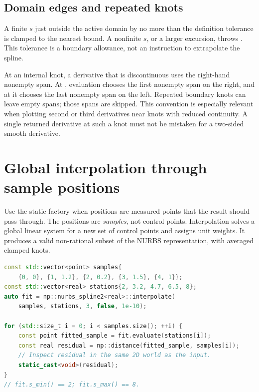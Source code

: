 \subsection{Domain edges and repeated knots}

A finite $s$ just outside the active domain by no more than the definition
tolerance is clamped to the nearest bound. A nonfinite $s$, or a larger
excursion, throws . This tolerance is a boundary
allowance, not an instruction to extrapolate the spline.

At an internal knot, a derivative that is discontinuous uses the right-hand
nonempty span. At , evaluation chooses the first nonempty span
on the right, and at  it chooses the last nonempty span on the
left. Repeated boundary knots can leave empty spans; those spans are skipped.
This convention is especially relevant when plotting second or third
derivatives near knots with reduced continuity. A single returned derivative
at such a knot must not be mistaken for a two-sided smooth derivative.

\section{Global interpolation through sample positions}
\label{sec:spline-interpolation}

Use the static  factory when positions
are measured points that the result should pass through. The positions are
\emph{samples}, not control points. Interpolation solves a global linear
system for a new set of control points and assigns unit weights. It produces
a valid non-rational subset of the NURBS representation, with averaged
clamped knots.

\begin{lstlisting}[language=C++,caption={Interpolation preserves the supplied station domain.}]
const std::vector<point> samples{
    {0, 0}, {1, 1.2}, {2, 0.2}, {3, 1.5}, {4, 1}};
const std::vector<real> stations{2, 3.2, 4.7, 6.5, 8};
auto fit = np::nurbs_spline2<real>::interpolate(
    samples, stations, 3, false, 1e-10);

for (std::size_t i = 0; i < samples.size(); ++i) {
    const point fitted_sample = fit.evaluate(stations[i]);
    const real residual = np::distance(fitted_sample, samples[i]);
    // Inspect residual in the same 2D world as the input.
    static_cast<void>(residual);
}
// fit.s_min() == 2; fit.s_max() == 8.
\end{lstlisting}

